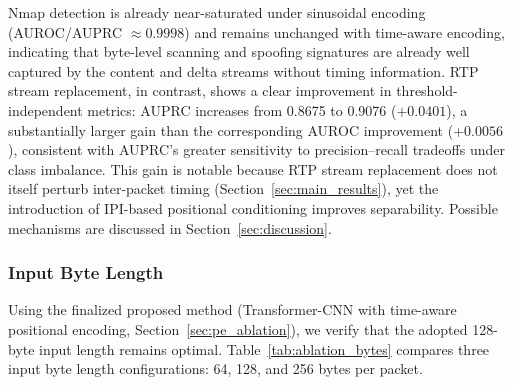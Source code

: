 Nmap detection is already near-saturated under sinusoidal encoding (AUROC/AUPRC $\approx 0.9998$) and remains unchanged with time-aware encoding, indicating that byte-level scanning and spoofing signatures are already well captured by the content and delta streams without timing information. RTP stream replacement, in contrast, shows a clear improvement in threshold-independent metrics: AUPRC increases from 0.8675 to 0.9076 ($+0.0401$), a substantially larger gain than the corresponding AUROC improvement ($+0.0056$), consistent with AUPRC's greater sensitivity to precision--recall tradeoffs under class imbalance. This gain is notable because RTP stream replacement does not itself perturb inter-packet timing (Section~\ref{sec:main_results}), yet the introduction of IPI-based positional conditioning improves separability. Possible mechanisms are discussed in Section~\ref{sec:discussion}.

\subsubsection{Input Byte Length}
\label{sec:bytelen_ablation}
Using the finalized proposed method (Transformer-CNN with time-aware positional encoding, Section~\ref{sec:pe_ablation}), we verify that the adopted 128-byte input length remains optimal. Table~\ref{tab:ablation_bytes} compares three input byte length configurations: 64, 128, and 256 bytes per packet.

\begin{table}[!htbp]
\centering
\caption{Ablation study: input byte length, evaluated on the proposed method (Transformer-CNN, time-aware PE). Each variant is read at its own best-overall-F1 threshold, selected on the evaluation files, so these are per-variant optima rather than unbiased estimates (Table~\ref{tab:ablation_pe_cat} is threshold-independent). Overall F1: micro-avg (all 27 files); RTP/Nmap F1: macro-avg within category.}
\label{tab:ablation_bytes}
\small
{}
\end{table}

